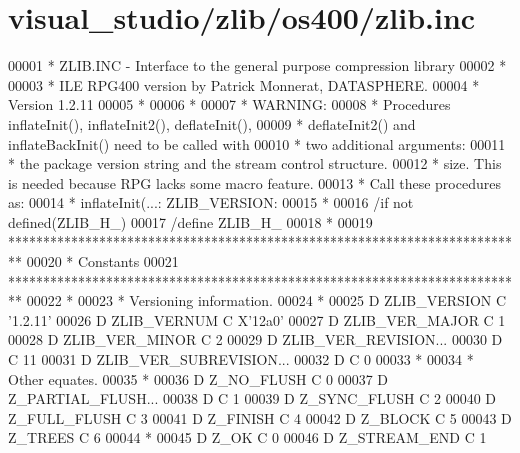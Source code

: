\hypertarget{visual__studio_2zlib_2os400_2zlib_8inc_source}{}\section{visual\+\_\+studio/zlib/os400/zlib.inc}
\label{visual__studio_2zlib_2os400_2zlib_8inc_source}

\begin{DoxyCode}
00001       *  ZLIB.INC - Interface to the general purpose compression library
00002       *
00003       *  ILE RPG400 version by Patrick Monnerat, DATASPHERE.
00004       *  Version 1.2.11
00005       *
00006       *
00007       *  WARNING:
00008       *     Procedures inflateInit(), inflateInit2(), deflateInit(),
00009       *         deflateInit2() and inflateBackInit() need to be called with
00010       *         two additional arguments:
00011       *         the package version \textcolor{keywordtype}{string} and the stream control structure.
00012       *         size. This is needed because RPG lacks some macro feature.
00013       *         Call these procedures as:
00014       *             inflateInit(...: ZLIB\_VERSION: %
00015       *
00016       /if not defined(ZLIB\_H\_)
00017       /define ZLIB\_H\_
00018       *
00019       **************************************************************************
00020       *                               Constants
00021       **************************************************************************
00022       *
00023       *  Versioning information.
00024       *
00025      D ZLIB\_VERSION    C                   '1.2.11'
00026      D ZLIB\_VERNUM     C                   X'12a0'
00027      D ZLIB\_VER\_MAJOR  C                   1
00028      D ZLIB\_VER\_MINOR  C                   2
00029      D ZLIB\_VER\_REVISION...
00030      D                 C                   11
00031      D ZLIB\_VER\_SUBREVISION...
00032      D                 C                   0
00033       *
00034       *  Other equates.
00035       *
00036      D Z\_NO\_FLUSH      C                   0
00037      D Z\_PARTIAL\_FLUSH...
00038      D                 C                   1
00039      D Z\_SYNC\_FLUSH    C                   2
00040      D Z\_FULL\_FLUSH    C                   3
00041      D Z\_FINISH        C                   4
00042      D Z\_BLOCK         C                   5
00043      D Z\_TREES         C                   6
00044       *
00045      D Z\_OK            C                   0
00046      D Z\_STREAM\_END    C                   1

\end{DoxyCode}
